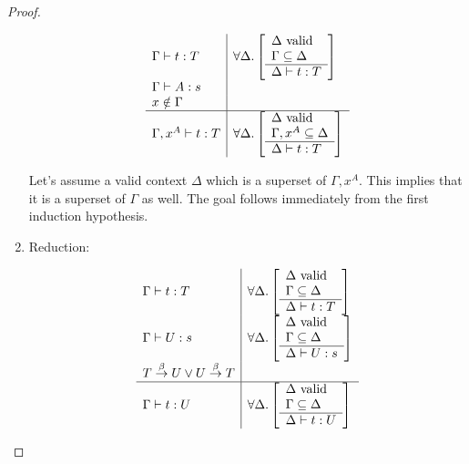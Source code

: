 \begin{theorem}
\begin{proof}
\begin{enumerate}
            $$
            \begin{array}{l|l}
                \Gamma \vdash t : T
                &
                \forall \Delta
                    . \left[\begin{array}{l} 
                        \Delta \text{ valid}
                        \\
                        \Gamma \subseteq \Delta
                     \\ \hline 
                        \Delta \vdash t : T
                    \end{array}\right]
                \\
                \Gamma \vdash A : s
                \\
                x \notin \Gamma
                \\
                \hline
                \Gamma,x^A \vdash t : T
                &
                \forall \Delta
                    . \left[\begin{array}{l} 
                        \Delta \text{ valid}
                        \\
                        \Gamma, x^A \subseteq \Delta
                     \\ \hline 
                        \Delta \vdash t : T
                    \end{array}\right]
            \end{array}
            $$

            Let's assume a valid context $\Delta$ which is a superset of
            $\Gamma,x^A$. This implies that it is a superset of $\Gamma$ as
            well. The goal follows immediately from the first induction
            hypothesis.

        \item Reduction:

            $$
            \begin{array}{l|l}
                \Gamma \vdash t : T
                &
                \forall \Delta
                    . \left[\begin{array}{l} 
                        \Delta \text{ valid}
                        \\
                        \Gamma \subseteq \Delta
                     \\ \hline 
                        \Delta \vdash t : T
                    \end{array}\right]
                \\
                \Gamma \vdash U : s
                &
                \forall \Delta
                    . \left[\begin{array}{l} 
                        \Delta \text{ valid}
                        \\
                        \Gamma \subseteq \Delta
                     \\ \hline 
                        \Delta \vdash U : s
                    \end{array}\right]
                \\
                T \stackrel{\beta}{\to} U \lor U \stackrel{\beta}{\to} T
                \\
                \hline
                \Gamma \vdash t : U
                &
                \forall \Delta
                    . \left[\begin{array}{l} 
                        \Delta \text{ valid}
                        \\
                        \Gamma \subseteq \Delta
                     \\ \hline 
                        \Delta \vdash t : U
                    \end{array}\right]
            \end{array}
            $$


\end{enumerate}
\end{proof}
\end{theorem}
